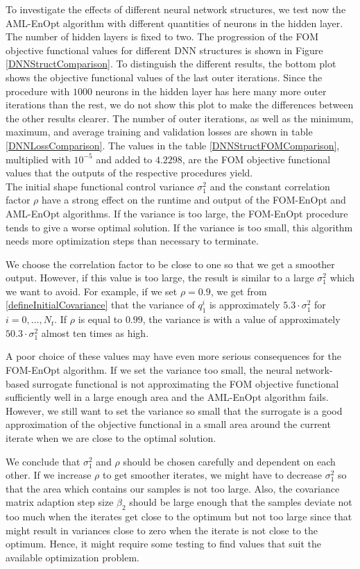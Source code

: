 To investigate the effects of different neural network structures, we test now the AML-EnOpt algorithm with different quantities of neurons in the hidden layer. The number of hidden layers is fixed to two. The progression of the FOM objective functional values for different DNN structures is shown in Figure \ref{DNNStructComparison}. To distinguish the different results, the bottom plot shows the objective functional values of the last outer iterations. Since the procedure with $1000$ neurons in the hidden layer has here many more outer iterations than the rest, we do not show this plot to make the differences between the other results clearer. The number of outer iterations, as well as the minimum, maximum, and average training and validation losses are shown in table \ref{DNNLossComparison}. The values in the table \ref{DNNStructFOMComparison}, multiplied with $10^{-5}$ and added to $4.2298$, are the FOM objective functional values that the outputs of the respective procedures yield.\\

The initial shape functional control variance $\sigma^2_1$ and the constant correlation factor $\rho$ have a strong effect on the runtime and output of the FOM-EnOpt and AML-EnOpt algorithms. If the variance is too large, the FOM-EnOpt procedure tends to give a worse optimal solution. If the variance is too small, this algorithm needs more optimization steps than necessary to terminate.

We choose the correlation factor to be close to one so that we get a smoother output. However, if this value is too large, the result is similar to a large $\sigma^2_1$ which we want to avoid. For example, if we set $\rho=0.9$, we get from \eqref{defineInitialCovariance} that the variance of $q^i_1$ is approximately $5.3\cdot\sigma^2_1$ for $i=0,\dotsc,N_t$. If $\rho$ is equal to $0.99$, the variance is with a value of approximately $50.3\cdot\sigma^2_1$ almost ten times as high.

A poor choice of these values may have even more serious consequences for the FOM-EnOpt algorithm. If we set the variance too small, the neural network-based surrogate functional is not approximating the FOM objective functional sufficiently well in a large enough area and the AML-EnOpt algorithm fails. However, we still want to set the variance so small that the surrogate is a good approximation of the objective functional in a small area around the current iterate when we are close to the optimal solution.

We conclude that $\sigma^2_1$ and $\rho$ should be chosen carefully and dependent on each other. If we increase $\rho$ to get smoother iterates, we might have to decrease $\sigma^2_1$ so that the area which contains our samples is not too large. Also, the covariance matrix adaption step size $\beta_2$ should be large enough that the samples deviate not too much when the iterates get close to the optimum but not too large since that might result in variances close to zero when the iterate is not close to the optimum. Hence, it might require some testing to find values that suit the available optimization problem.\\

